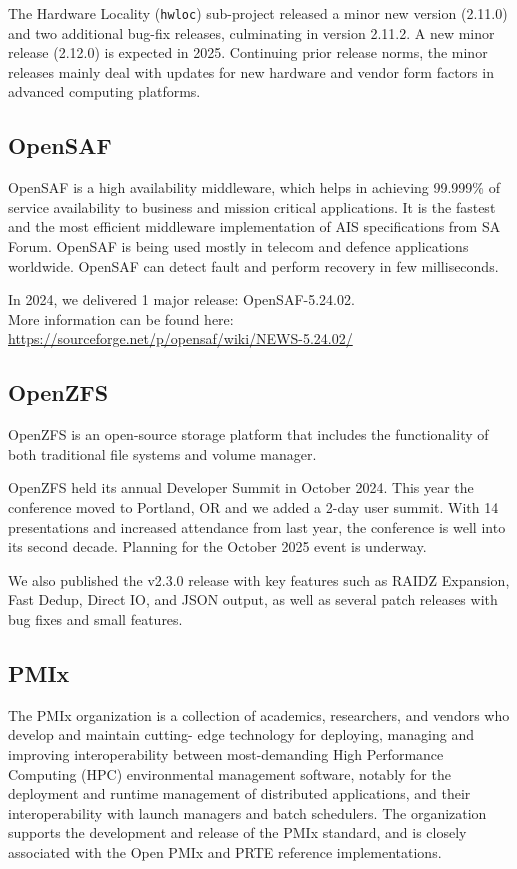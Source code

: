 \documentclass[a4paper]{report}
\begin{document}
The Hardware Locality ({\tt hwloc}) sub-project released a minor new version (2.11.0) and two additional bug-fix releases, culminating in version 2.11.2.  A new minor release (2.12.0) is expected in 2025.  Continuing prior release norms, the minor releases mainly deal with updates for new hardware and vendor form factors in advanced computing platforms.

\subsection{OpenSAF}

OpenSAF is a high availability middleware, which helps in achieving 99.999\% of service availability to business and mission critical applications. It is the fastest and the most efficient middleware implementation of AIS specifications from SA Forum. OpenSAF is being used mostly in telecom and defence applications worldwide. OpenSAF can detect fault and perform recovery in few milliseconds.

In 2024, we delivered 1 major release: OpenSAF-5.24.02.\\
More information can be found here: \href{https://sourceforge.net/p/opensaf/wiki/NEWS-5.24.02/}{https://sourceforge.net/p/opensaf/wiki/NEWS-5.24.02/}

\subsection{OpenZFS}

OpenZFS is an open-source storage platform that includes the functionality of both traditional file systems and volume manager.

OpenZFS held its annual Developer Summit in October 2024.  This year the conference moved to Portland, OR and we added a 2-day user summit. With 14 presentations and increased attendance from last year, the conference is well into its second decade. Planning for the October 2025 event is underway.

We also published the v2.3.0 release with key features such as RAIDZ Expansion, Fast Dedup, Direct IO, and JSON output, as well as several patch releases with bug fixes and small features.

\subsection{PMIx}

The PMIx organization is a collection of academics, researchers, and vendors who develop and maintain cutting- edge technology for deploying, managing and improving interoperability between most-demanding High Performance Computing (HPC) environmental management software, notably for the deployment and runtime management of distributed applications, and their interoperability with launch managers and batch schedulers. The organization supports the development and release of the PMIx standard, and is closely associated with the Open PMIx and PRTE reference implementations.
\end{document}
